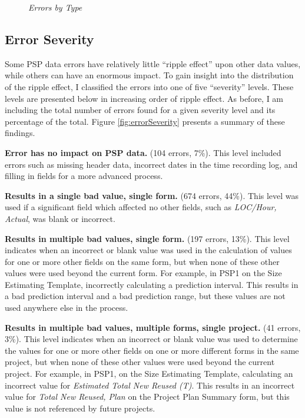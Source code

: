 \begin{figure}[h] 
    {\centerline{}}
    \caption[Errors by Type]{\label{fig:errorTypes} 
      {\em Errors by Type}}
\end{figure}


\subsection{Error Severity}
Some PSP data errors have relatively little ``ripple effect'' upon other
data values, while others can have an enormous impact.  To gain insight
into the distribution of the ripple effect, I classified the errors into
one of five ``severity'' levels.  These levels are presented below in
increasing order of ripple effect.  As before, I am including the total
number of errors found for a given severity level and its percentage of the 
total.  Figure \ref{fig:errorSeverity} presents a summary of these findings.

{\bf Error has no impact on PSP data.} (104 errors, 7\%).
This level included errors such as missing header data, incorrect dates in
the time recording log, and filling in fields for a more advanced process.

{\bf Results in a single bad value, single form.} (674 errors, 44\%). 
This level was used if a significant field which affected no other fields,
such as {\it LOC/Hour, Actual}, was blank or incorrect.

{\bf Results in multiple bad values, single form.} (197 errors, 13\%).
This level indicates when an incorrect or blank value was used in the
calculation of values for one or more other fields on the same form, but
when none of these other values were used beyond the current form.  For
example, in PSP1 on the Size Estimating Template, incorrectly calculating a
prediction interval.  This results in a bad prediction interval and a bad
prediction range, but these values are not used anywhere else in the
process.

{\bf Results in multiple bad values, multiple forms, single project.}
(41 errors, 3\%).
This level indicates when an incorrect or blank value was used to determine
the values for one or more other fields on one or more different forms in
the same project, but when none of these other values were used beyond the
current project.  For example, in PSP1, on the Size Estimating Template,
calculating an incorrect value for {\it Estimated Total New Reused (T)}.
This results in an incorrect value for {\it Total New Reused, Plan} on the
Project Plan Summary form, but this value is not referenced by future
projects.

